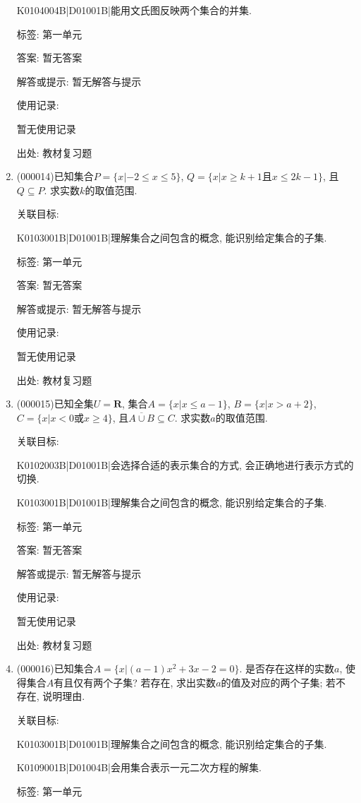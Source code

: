 \documentclass[10pt,a4paper]{article}
\begin{document}
\begin{enumerate}[1.]
K0104004B|D01001B|能用文氏图反映两个集合的并集.



标签: 第一单元

答案: 暂无答案

解答或提示: 暂无解答与提示

使用记录:

暂无使用记录


出处: 教材复习题
\item { (000014)}已知集合$P=\{x|-2\le x\le 5\}$, $Q=\{x|x\ge k+1\text{且}x\le 2k-1\}$, 且$Q\subseteq P$. 求实数$k$的取值范围.


关联目标:

K0103001B|D01001B|理解集合之间包含的概念, 能识别给定集合的子集.



标签: 第一单元

答案: 暂无答案

解答或提示: 暂无解答与提示

使用记录:

暂无使用记录


出处: 教材复习题
\item { (000015)}已知全集$U=\mathbf{R}$, 集合$A=\{x|x\le a-1\}$, $B=\{x|x>a+2\}$, $C=\{x|x<0\text{或}x\ge 4\}$, 且$\overline{A\cup B}\subseteq C$. 求实数$a$的取值范围.


关联目标:

K0102003B|D01001B|会选择合适的表示集合的方式, 会正确地进行表示方式的切换.

K0103001B|D01001B|理解集合之间包含的概念, 能识别给定集合的子集.



标签: 第一单元

答案: 暂无答案

解答或提示: 暂无解答与提示

使用记录:

暂无使用记录


出处: 教材复习题
\item { (000016)}已知集合$A=\{x|(a-1)x^2+3x-2=0\}$. 是否存在这样的实数$a$, 使得集合$A$有且仅有两个子集? 若存在, 求出实数$a$的值及对应的两个子集; 若不存在, 说明理由.


关联目标:

K0103001B|D01001B|理解集合之间包含的概念, 能识别给定集合的子集.

K0109001B|D01004B|会用集合表示一元二次方程的解集.



标签: 第一单元


\end{enumerate}
\end{document}
